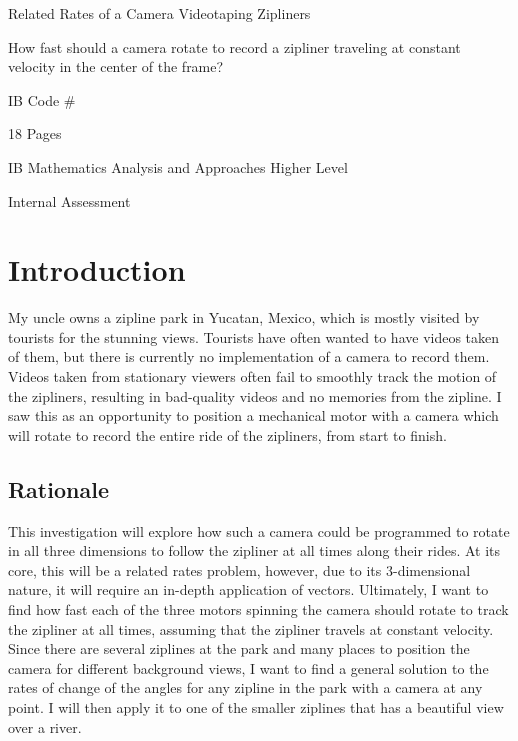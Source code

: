 \documentclass[12pt]{article}
\begin{document}
\begin{titlepage}
   \begin{center}
        \vspace*{5cm}

        \Huge{Related Rates of a Camera Videotaping Zipliners}

        \vspace{1cm}
        \LARGE{How fast should a camera rotate to record a zipliner traveling at constant velocity in the center of the frame?}
            
        \vspace{2 cm}
        \Large{IB Code \#}
        
        \vspace{0.5 cm}
        \large{18 Pages}
       
        \vspace{2cm}
        \large{IB Mathematics Analysis and Approaches Higher Level}
       
        \vspace{1 cm}
        \Large{Internal Assessment}
       

       \vfill
    \end{center}
\end{titlepage}
    
\tableofcontents
\newpage
    
\section{Introduction}
My uncle owns a zipline park in Yucatan, Mexico, which is mostly visited by tourists for the stunning views. Tourists have often wanted to have videos taken of them, but there is currently no implementation of a camera to record them. Videos taken from stationary viewers often fail to smoothly track the motion of the zipliners, resulting in bad-quality videos and no memories from the zipline. I saw this as an opportunity to position a mechanical motor with a camera which will rotate to record the entire ride of the zipliners, from start to finish. 

\subsection{Rationale}
This investigation will explore how such a camera could be programmed to rotate in all three dimensions to follow the zipliner at all times along their rides. At its core, this will be a related rates problem, however, due to its 3-dimensional nature, it will require an in-depth application of vectors. Ultimately, I want to find how fast each of the three motors spinning the camera should rotate to track the zipliner at all times, assuming that the zipliner travels at constant velocity. Since there are several ziplines at the park and many places to position the camera for different background views, I want to find a general solution to the rates of change of the angles for any zipline in the park with a camera at any point. I will then apply it to one of the smaller ziplines that has a beautiful view over a river. 
\end{document}
